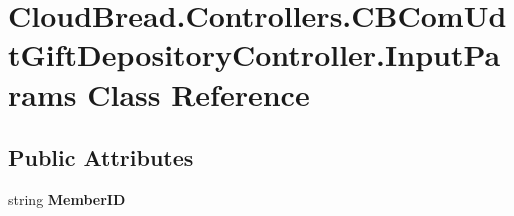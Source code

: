 \hypertarget{class_cloud_bread_1_1_controllers_1_1_c_b_com_udt_gift_depository_controller_1_1_input_params}{}\section{Cloud\+Bread.\+Controllers.\+C\+B\+Com\+Udt\+Gift\+Depository\+Controller.\+Input\+Params Class Reference}
\label{class_cloud_bread_1_1_controllers_1_1_c_b_com_udt_gift_depository_controller_1_1_input_params}
\subsection*{Public Attributes}
\begin{DoxyCompactItemize}
\item 
string {\bfseries Member\+ID}\hypertarget{class_cloud_bread_1_1_controllers_1_1_c_b_com_udt_gift_depository_controller_1_1_input_params_a4e88ae801115ca1db8b86a9d21e63ad1}{}\label{class_cloud_bread_1_1_controllers_1_1_c_b_com_udt_gift_depository_controller_1_1_input_params_a4e88ae801115ca1db8b86a9d21e63ad1}

\end{DoxyCompactItemize}
